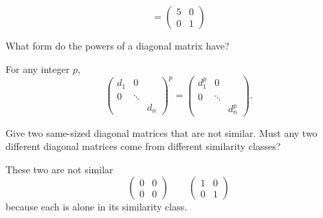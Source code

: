 \begin{exercises}
\begin{answer}
\begin{exparts}
\begin{equation*}
            =
            \begin{pmatrix}
               5  &0  \\
               0  &1
            \end{pmatrix}
          \end{equation*}
      \end{exparts}
    \end{answer}
  \recommended \item \label{exer:PowersOfDiags}
    What form do the powers of a diagonal matrix have?
    \begin{answer}
      For any integer \( p \),
      \begin{equation*}
        \begin{pmatrix}
          d_1  &0      &   \\
          0    &\ddots &   \\
               &       &d_n
        \end{pmatrix}^p=
        \begin{pmatrix}
          d_1^p  &0      &   \\
          0      &\ddots &   \\
                 &       &d_n^p
        \end{pmatrix}.
     \end{equation*} 
    \end{answer}
  \item 
     Give two same-sized diagonal matrices that are not similar.
     Must any two different diagonal matrices come from different similarity
     classes?
     \begin{answer}
       These two are not similar 
       \begin{equation*}
          \begin{pmatrix}
             0  &0  \\
             0  &0
          \end{pmatrix}
          \qquad
          \begin{pmatrix}
             1  &0  \\
             0  &1
          \end{pmatrix}
       \end{equation*}
       because each is alone in its similarity class.


\end{answer}
\end{exercises}
